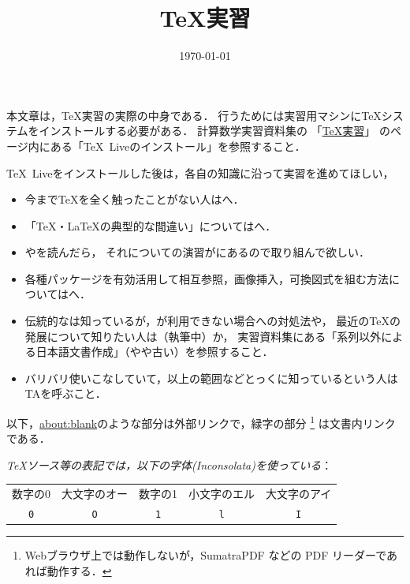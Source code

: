 \documentclass{ltjsarticle}
\title{\TeX 実習}
\date{\today}
\author{}
\begin{document}
\VerbatimFootnotes
{}\zw
\maketitle

本文章は，\TeX 実習の実際の中身である．
行うためには実習用マシンに\TeX システムをインストールする必要がある．
計算数学実習資料集の
「\href{https://github.com/utmsks/KSImaterial/blob/master/contents/tex/tex_practice.md}{\TeX 実習}」
のページ内にある「\TeX~Liveのインストール」を参照すること．


\TeX~Liveをインストールした後は，各自の知識に沿って実習を進めてほしい，
\begin{itemize}
\item 今まで\TeX を全く触ったことがない人はへ．
\item 「\TeX・\LaTeX の典型的な間違い」についてはへ．
\item {}やを読んだら，
 それについての演習がにあるので取り組んで欲しい．
\item 各種パッケージを有効活用して相互参照，画像挿入，可換図式を組む方法についてはへ．
\item 伝統的な\pLaTeX は知っているが，\pLaTeX が利用できない場合への対処法や，
 最近の\TeX の発展について知りたい人は（執筆中）か，
 実習資料集にある「\pTeX 系列以外による日本語文書作成」（やや古い）を参照すること．
\item バリバリ使いこなしていて，以上の範囲などとっくに知っているという人はTAを呼ぶこと．
\end{itemize}

以下，\url{about:blank}のような部分は外部リンクで，緑字の部分
\footnote{Webブラウザ上では動作しないが，SumatraPDF などの PDF リーダーであれば動作する．}
は文書内リンクである．

\bigskip

\emph{\TeX ソース等の表記では，以下の字体(Inconsolata)を使っている}：
\begin{center}
\begin{tabular}{ccccc}
\toprule
数字の0&大文字のオー&数字の1&小文字のエル&大文字のアイ\\
\cmidrule(lr){1-2}\cmidrule(lr){3-5}
\Large\texttt{0}&\Large\texttt{O}
&\Large\texttt{1}&\Large\texttt{l}&\Large\texttt{I}\\
\bottomrule
\end{tabular}
\end{center}
\end{document}
